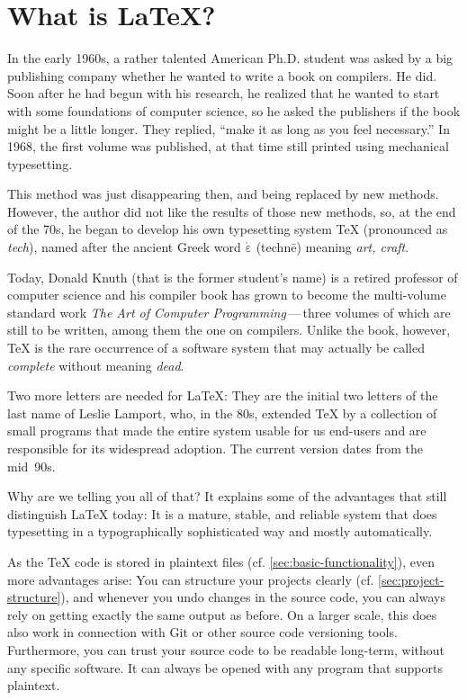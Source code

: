 \chapter{What is \LaTeX?}
\label{sec:what-is-latex}

In the early 1960s, a rather talented American Ph.D. student was asked by a big publishing company whether he wanted to write a book on compilers.
He did.
Soon after he had begun with his research, he realized that he wanted to start with some foundations of computer science, so he asked the publishers if the book might be a little longer.
They replied, \enquote{make it as long as you feel necessary.}
In 1968, the first volume was published, at that time still printed using mechanical typesetting.

This method was just disappearing then, and being replaced by new methods.
However, the author did not like the results of those new methods, so,
at the end of the 70s, he began to develop his own typesetting system \TeX{}
(pronounced as \emph{tech}), named after the ancient Greek word \texttau$\mathrm{\acute{\varepsilon}}$\textchi\textnu\texteta{} (technē) meaning \emph{art, craft}.

Today, Donald Knuth (that is the former student’s name) is a retired professor of computer science and his compiler book has grown to become the multi-volume standard work \emph{The Art of Computer Programming}\,—\,three volumes of which are still to be written, among them the one on compilers.
Unlike the book, however, \TeX{} is the rare occurrence of a software system that may actually be called \emph{complete} without meaning \emph{dead}.

Two more letters are needed for \LaTeX:
They are the initial two letters of the last name of Leslie Lamport, who, in the 80s, extended \TeX{} by a collection of small programs that made the entire system usable for us end-users and are responsible for its widespread adoption.
The current version dates from the mid~90s.

Why are we telling you all of that?
It explains some of the advantages that still distinguish \LaTeX{} today:
It is a mature, stable, and reliable system
that does typesetting in a typographically sophisticated way and mostly automatically.

As the \TeX{} code is stored in plaintext files (cf. \cref{sec:basic-functionality}),
even more advantages arise:
You can structure your projects clearly (cf. \cref{sec:project-structure}),
and whenever you undo changes in the source code, you can always rely on getting exactly the same output as before.
On a larger scale, this does also work in connection with Git or other source code versioning tools.
Furthermore, you can trust your source code to be readable long-term, without any specific software.
It can always be opened with any program that supports plaintext.

